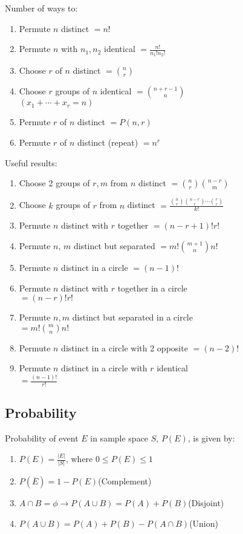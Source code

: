 \documentclass[12pt, a4paper]{article}
\begin{document}
\begin{multicols*}{3}
Number of ways to:
\begin{enumerate}[\roman*.]
  \item Permute $n$ distinct $= n!$
  \item Permute $n$ with $n_1, n_2$ identical $= \frac{n!}{n_1!n_2!}$
  \item Choose $r$ of $n$ distinct $= \binom nr$
  \item Choose $r$ groups of $n$ identical $= \binom{n+r-1}n$\\
    $(x_1+\cdots+x_r=n)$
  \item Permute $r$ of $n$ distinct $= P(n,r)$
  \item Permute $r$ of $n$ distinct (repeat) $= n^r$
\end{enumerate}
Useful results:
\begin{enumerate}[\roman*.]
  \item Choose 2 groups of $r,m$ from $n$ distinct $= \binom nr \binom {n-r}m$
  \item Choose $k$ groups of $r$ from $n$ distinct $= \frac{\binom nr \binom{n-r}r \cdots \binom rr}{k!}$
  \item Permute $n$ distinct with $r$ together $= (n-r+1)!r!$ 
  \item Permute $n$, $m$ distinct but separated $= m! \binom{m+1}n n!$ 
  \item Permute $n$ distinct in a circle $= (n-1)!$
  \item Permute $n$ distinct with $r$ together in a circle\\$= (n-r)!r!$
  \item Permute $n, m$ distinct but separated in a circle \\$= m! \binom mn n!$
  \item Permute $n$ distinct in a circle with 2 opposite $= (n-2)!$
  \item Permute $n$ distinct in a circle with $r$ identical\\$=\frac{(n-1)!}{r!}$
\end{enumerate}

\subsection{Probability}
Probability of event $E$ in sample space $S$, $P(E)$, is given by:
\begin{enumerate}[\roman*.]
  \item $P(E) = \frac{|E|}{|S|}$, where $0 \leq P(E) \leq 1$
  \item $P(\overline{E}) = 1 - P(E)$\hfill(Complement)
  \item $A \cap B = \phi \rightarrow P(A\cup B) = P(A) + P(B)$\hfill(Disjoint)
  \item $P(A\cup B) = P(A) + P(B)- P(A\cap B)$\hfill(Union)
\end{enumerate}


\end{multicols*}
\end{document}
